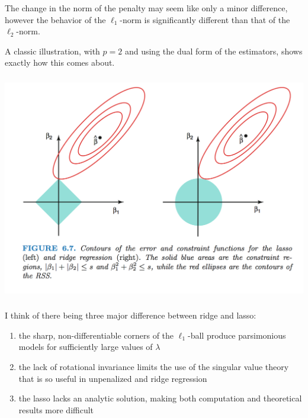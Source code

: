 \begin{frame}[fragile] \frametitle{}

The change in the norm of the penalty may seem like only a
minor difference, however the behavior of the $\ell_1$-norm
is significantly different than that of the $\ell_2$-norm.

\pause A classic illustration, with $p=2$ and using the dual
form of the estimators, shows exactly how this comes about.

\end{frame}

\begin{frame}[fragile] \frametitle{}

\begin{center}
\includegraphics[width=\textwidth]{img/img01.png}
\end{center}

\end{frame}

\begin{frame}[fragile] \frametitle{}

I think of there being three major difference between ridge
and lasso:
\begin{enumerate}
\item the sharp, non-differentiable corners of the $\ell_1$-ball
produce parsimonious models for sufficiently large values of $\lambda$ \pause
\item the lack of rotational invariance limits the use of the singular
value theory that is so useful in unpenalized and ridge regression \pause
\item the lasso lacks an analytic solution, making both computation
and theoretical results more difficult
\end{enumerate}

\end{frame}

